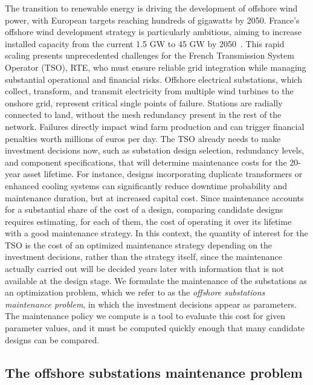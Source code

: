 \documentclass{article}
\begin{document}
The transition to renewable energy is driving the development of offshore wind power, with European targets reaching hundreds of gigawatts by 2050. France’s offshore wind development strategy is particularly
ambitious, aiming to increase installed capacity from the
current 1.5 GW to 45 GW by 2050~\cite{futurs}. This rapid scaling
presents unprecedented challenges for the French Transmission System
Operator (TSO), RTE, who must ensure reliable grid integration
while managing substantial operational and financial risks. Offshore electrical substations, which collect, transform, and
transmit electricity from multiple wind turbines to the onshore grid, represent critical single points of failure. Stations
are radially
connected to land, without the mesh redundancy present in the rest of the network. Failures directly impact wind farm
production and can trigger financial penalties worth millions of euros per day.
The TSO already needs to make investment decisions now, such
as substation design selection, redundancy levels, and component specifications, that will determine maintenance costs for
the 20-year asset lifetime. For instance, designs incorporating duplicate transformers or enhanced cooling systems can
significantly reduce downtime probability and maintenance duration, but at increased capital cost. Since maintenance
accounts for a substantial share of the cost of a design, comparing candidate designs requires estimating, for each of
them, the cost of operating it over its lifetime with a good maintenance strategy. In this context, the quantity of interest for the TSO is
the cost of an optimized maintenance strategy depending on the
investment decisions, rather than the strategy itself, since the maintenance actually carried out will be decided years
later with information that is not available at the design stage. We formulate the maintenance of the substations as an optimization
problem, which we refer to as the \emph{offshore substations maintenance problem}, in which the investment decisions
appear as parameters. The maintenance policy we compute is a tool to evaluate this cost for given parameter values, and
it must be computed quickly enough that many candidate designs can be compared.

\subsection{The offshore substations maintenance problem}
\label{sec:intro-application}
\end{document}
